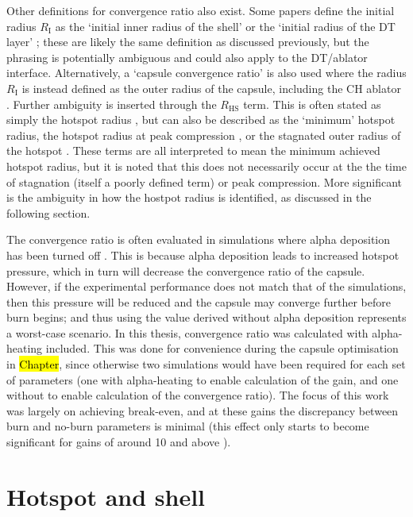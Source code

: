 Other definitions for convergence ratio also exist. Some papers define the initial radius $R_\mathrm{I}$ as the `initial inner radius of the shell' \cite{Craxton2015} or the `initial radius of the DT layer' \cite{Haines2017a}; these are likely the same definition as discussed previously, but the phrasing is potentially ambiguous and could also apply to the DT/ablator interface. Alternatively, a `capsule convergence ratio' is also used where the radius $R_\mathrm{I}$ is instead defined as the outer radius of the capsule, including the CH ablator \cite{Lindl2004}. Further ambiguity is inserted through the $R_\mathrm{HS}$ term. This is often stated as simply the hotspot radius \cite{Olson2016, Olson2021}, but can also be described as the `minimum' hotspot radius, the hotspot radius at peak compression \cite{Craxton2015}, or the stagnated outer radius of the hotspot \cite{Zylstra2018}. These terms are all interpreted to mean the minimum achieved hotspot radius, but it is noted that this does not necessarily occur at the the time of stagnation (itself a poorly defined term) or peak compression. More significant is the ambiguity in how the hostpot radius is identified, as discussed in the following section.

The convergence ratio is often evaluated in simulations where alpha deposition has been turned off \cite{Craxton2015}. This is because alpha deposition leads to increased hotspot pressure, which in turn will decrease the convergence ratio of the capsule. However, if the experimental performance does not match that of the simulations, then this pressure will be reduced and the capsule may converge further before burn begins; and thus using the value derived without alpha deposition represents a worst-case scenario. In this thesis, convergence ratio was calculated with alpha-heating included. This was done for convenience during the capsule optimisation in \hl{Chapter}, since otherwise two simulations would have been required for each set of parameters (one with alpha-heating to enable calculation of the gain, and one without to enable calculation of the convergence ratio). The focus of this work was largely on achieving break-even, and at these gains the discrepancy between burn and no-burn parameters is minimal (this effect only starts to become significant for gains of around 10 and above \cite{GoncharovPersonalComm}).

\section{Hotspot and shell}

